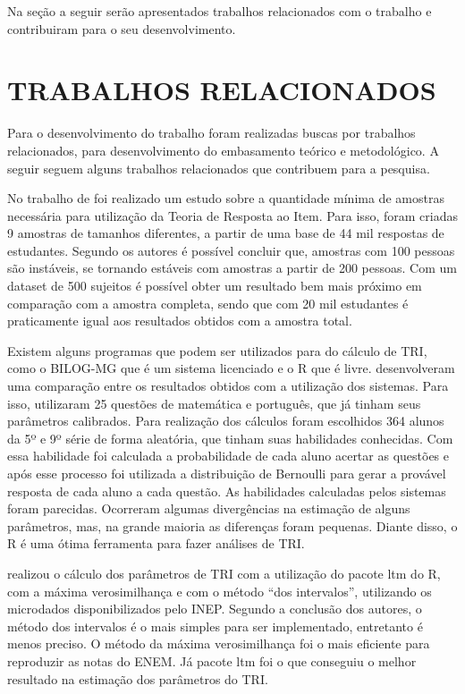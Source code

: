 \documentclass[article,	12pt,	oneside, a4paper,	english, brazil, sumario=tradicional, section=TITLE]{abntex2}
\begin{document}
Na seção a seguir serão apresentados trabalhos relacionados com o trabalho e contribuiram para o seu desenvolvimento.

\section{TRABALHOS RELACIONADOS}

Para o desenvolvimento do trabalho foram realizadas buscas por trabalhos relacionados, para desenvolvimento do embasamento teórico  e metodológico. A seguir seguem alguns trabalhos relacionados que contribuem para a pesquisa.

No trabalho de  foi realizado um estudo sobre a quantidade mínima de amostras necessária para utilização da Teoria de Resposta ao Item. Para isso, foram criadas 9 amostras de tamanhos diferentes, a partir de uma base de 44 mil respostas de estudantes. Segundo os autores é possível concluir que, amostras com 100 pessoas são instáveis, se tornando estáveis com amostras a partir de 200 pessoas. Com um dataset de 500 sujeitos é possível obter um resultado bem mais próximo em comparação com a amostra completa, sendo que com 20 mil estudantes é praticamente igual aos resultados obtidos com a amostra total.

Existem alguns programas que podem ser utilizados para do cálculo de TRI, como o BILOG-MG que é um sistema licenciado e o R \cite{rprogram} que é livre.  desenvolveram uma comparação entre os resultados obtidos com a utilização dos sistemas. Para isso, utilizaram 25 questões de matemática e português, que já tinham seus parâmetros calibrados. Para realização dos cálculos foram escolhidos 364 alunos da 5º e 9º série de forma aleatória, que tinham suas habilidades conhecidas. Com essa habilidade foi calculada a probabilidade de cada aluno acertar as questões e após esse processo foi utilizada a distribuição de Bernoulli para gerar a provável resposta de cada aluno a cada questão. As habilidades calculadas pelos sistemas foram parecidas. Ocorreram algumas divergências na estimação de alguns parâmetros, mas, na grande maioria as diferenças foram pequenas. Diante disso, o R é uma ótima ferramenta para fazer análises de TRI.

 realizou o cálculo dos parâmetros de TRI com a utilização do pacote ltm do R, com a máxima verosimilhança e com o método “dos intervalos”, utilizando os microdados disponibilizados pelo INEP. Segundo a conclusão dos autores, o método dos intervalos é o mais simples para ser implementado, entretanto é menos preciso. O método da máxima verosimilhança foi o mais eficiente para reproduzir as notas do ENEM. Já pacote ltm foi o que conseguiu o melhor resultado na estimação dos parâmetros do TRI.
\end{document}
